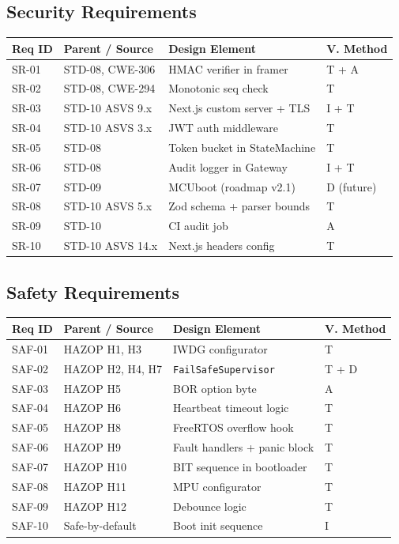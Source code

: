 \subsection{Security Requirements}
\begin{center}
\begin{tabular}{|l|l|l|l|}
\hline
\textbf{Req ID} & \textbf{Parent / Source} & \textbf{Design Element} & \textbf{V. Method} \\
\hline
SR-01 & STD-08, CWE-306 & HMAC verifier in framer & T + A \\
SR-02 & STD-08, CWE-294 & Monotonic seq check & T \\
SR-03 & STD-10 ASVS 9.x & Next.js custom server + TLS & I + T \\
SR-04 & STD-10 ASVS 3.x & JWT auth middleware & T \\
SR-05 & STD-08 & Token bucket in StateMachine & T \\
SR-06 & STD-08 & Audit logger in Gateway & I + T \\
SR-07 & STD-09 & MCUboot (roadmap v2.1) & D (future) \\
SR-08 & STD-10 ASVS 5.x & Zod schema + parser bounds & T \\
SR-09 & STD-10 & CI audit job & A \\
SR-10 & STD-10 ASVS 14.x & Next.js headers config & T \\
\hline
\end{tabular}
\end{center}

\subsection{Safety Requirements}
\begin{center}
\begin{tabular}{|l|l|l|l|}
\hline
\textbf{Req ID} & \textbf{Parent / Source} & \textbf{Design Element} & \textbf{V. Method} \\
\hline
SAF-01 & HAZOP H1, H3 & IWDG configurator & T \\
SAF-02 & HAZOP H2, H4, H7 & \texttt{FailSafeSupervisor} & T + D \\
SAF-03 & HAZOP H5 & BOR option byte & A \\
SAF-04 & HAZOP H6 & Heartbeat timeout logic & T \\
SAF-05 & HAZOP H8 & FreeRTOS overflow hook & T \\
SAF-06 & HAZOP H9 & Fault handlers + panic block & T \\
SAF-07 & HAZOP H10 & BIT sequence in bootloader & T \\
SAF-08 & HAZOP H11 & MPU configurator & T \\
SAF-09 & HAZOP H12 & Debounce logic & T \\
SAF-10 & Safe-by-default & Boot init sequence & I \\
\hline
\end{tabular}
\end{center}

